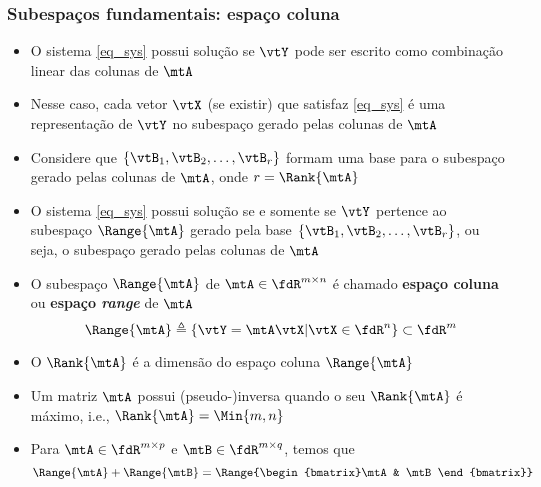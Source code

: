 \begin{frame}
  \frametitle{Subespaços fundamentais: espaço coluna}
  \begin{itemize}\small
    \item O sistema \eqref{eq_sys} possui solução se $\vtY$ pode ser escrito como combinação linear das colunas de $\mtA$
    \item Nesse caso, cada vetor $\vtX$ (se existir) que satisfaz \eqref{eq_sys} é uma representação de $\vtY$ no subespaço gerado pelas colunas de $\mtA$
    \item Considere que $\{\vtB_1, \vtB_2, \ldots, \vtB_r\}$ formam uma base para o subespaço gerado pelas colunas de $\mtA$, onde $r = \Rank{\mtA}$
    \item O sistema \eqref{eq_sys} possui solução se e somente se $\vtY$ pertence ao subespaço $\Range{\mtA}$ gerado pela base $\{\vtB_1, \vtB_2, \ldots, \vtB_r\}$, ou seja, o subespaço gerado pelas colunas de $\mtA$
    \item O subespaço $\Range{\mtA}$ de $\mtA \in \fdR^{m \times n}$ é chamado \textbf{\alert{espaço coluna}} ou \textbf{\alert{espaço \textit{range}}} de $ \mtA $
    \begin{equation}\label{eq_range_space}
      \Range{\mtA} \triangleq \left\{\vtY = \mtA\vtX \vert \vtX \in \fdR^n \right\} \subset \fdR^m
    \end{equation}
    \item O $\Rank{\mtA}$ é a dimensão do espaço coluna $\Range{\mtA}$
    \item Um matriz $\mtA$ possui (pseudo-)inversa quando o seu $\Rank{\mtA}$ é máximo, i.e., $\Rank{\mtA} = \Min{m,n}$
    \item Para $ \mtA \in \fdR^{m \times p} $ e $ \mtB \in \fdR^{m \times q} $, temos que
    \begin{equation}
      \Range{\mtA} + \Range{\mtB} = \Range{\begin{bmatrix}\mtA & \mtB\end{bmatrix}}
    \end{equation}
  \end{itemize}
\end{frame}

